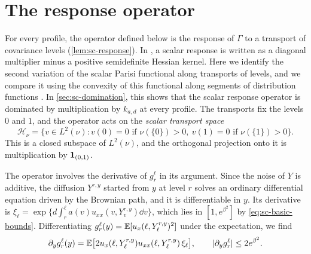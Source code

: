 \section{The response operator}\label{sec:sc-response}

For every profile, the operator defined below is the response of
$\Gamma$ to a transport of covariance levels (\cref{lem:sc-response}).
In \cite[Lemma~5.2, (H2)]{OpenAILimitingLaw}, a scalar response is
written as a diagonal multiplier minus a positive semidefinite Hessian
kernel. Here we identify the second variation of the scalar Parisi
functional along transports of levels, and we compare it using the
convexity of this functional along segments of distribution functions
\cite{AuffingerChen2015Uniqueness}. In \cref{sec:sc-domination}, this
shows that the scalar response operator is dominated by multiplication by
$k_{a,d}$ at every profile. The transports fix the levels $0$ and $1$,
and the operator acts on the \emph{scalar transport space}
\[
 \mathcal H_\nu=\bigl\{v\in L^2(\nu):
                 v(0)=0\text{ if }\nu(\{0\})>0,
                 \ v(1)=0\text{ if }\nu(\{1\})>0\bigr\}.
\]
This is a closed subspace of $L^2(\nu)$, and the orthogonal projection
onto it is multiplication by $\mathbf1_{(0,1)}$.

The operator involves the derivative of $g_r^\ell$ in its argument.
Since the noise of $Y$ is additive, the diffusion $Y^{r,y}$ started
from $y$ at level $r$ solves an ordinary differential equation driven
by the Brownian path, and it is differentiable in $y$. Its derivative
is $\xi_\ell=\exp\{d\int_r^\ell a(v)u_{xx}(v,Y^{r,y}_v)\dd v\}$, which
lies in $[1,e^{\beta^2}]$ by \eqref{eq:sc-basic-bounds}.
Differentiating $g_r^\ell(y)=\mathbb E[u_x(\ell,Y^{r,y}_\ell)^2]$ under the
expectation, we find
\begin{equation}\label{eq:sc-dg}
 \partial_yg_r^\ell(y)=\mathbb E\bigl[2u_x(\ell,Y_\ell^{r,y})
 u_{xx}(\ell,Y_\ell^{r,y})\,\xi_\ell\bigr],\qquad
 |\partial_yg_r^\ell|\le2e^{\beta^2}.
\end{equation}

